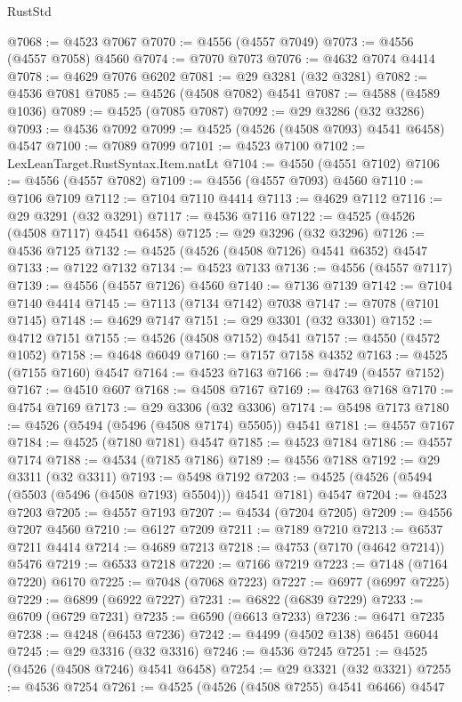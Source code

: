 \begin{lexlean}{RustStd}
\begin{coremodule}
{\begin{coremodule}
{{{{{{{{{{{{{{{{{{{{{{{{{{{{{{{{{{{{{{{{{{{{{{{{{{{{{{{@7068 := @4523 @7067
@7070 := @4556 (@4557 @7049)
@7073 := @4556 (@4557 @7058) @4560
@7074 := @7070 @7073
@7076 := @4632 @7074 @4414
@7078 := @4629 @7076 @6202
@7081 := @29 @3281 (@32 @3281)
@7082 := @4536 @7081
@7085 := @4526 (@4508 @7082) @4541
@7087 := @4588 (@4589 @1036)
@7089 := @4525 (@7085 @7087)
@7092 := @29 @3286 (@32 @3286)
@7093 := @4536 @7092
@7099 := @4525 (@4526 (@4508 @7093) @4541 @6458) @4547
@7100 := @7089 @7099
@7101 := @4523 @7100
@7102 := LexLeanTarget.RustSyntax.Item.natLt
@7104 := @4550 (@4551 @7102)
@7106 := @4556 (@4557 @7082)
@7109 := @4556 (@4557 @7093) @4560
@7110 := @7106 @7109
@7112 := @7104 @7110 @4414
@7113 := @4629 @7112
@7116 := @29 @3291 (@32 @3291)
@7117 := @4536 @7116
@7122 := @4525 (@4526 (@4508 @7117) @4541 @6458)
@7125 := @29 @3296 (@32 @3296)
@7126 := @4536 @7125
@7132 := @4525 (@4526 (@4508 @7126) @4541 @6352) @4547
@7133 := @7122 @7132
@7134 := @4523 @7133
@7136 := @4556 (@4557 @7117)
@7139 := @4556 (@4557 @7126) @4560
@7140 := @7136 @7139
@7142 := @7104 @7140 @4414
@7145 := @7113 (@7134 @7142) @7038
@7147 := @7078 (@7101 @7145)
@7148 := @4629 @7147
@7151 := @29 @3301 (@32 @3301)
@7152 := @4712 @7151
@7155 := @4526 (@4508 @7152) @4541
@7157 := @4550 (@4572 @1052)
@7158 := @4648 @6049
@7160 := @7157 @7158 @4352
@7163 := @4525 (@7155 @7160) @4547
@7164 := @4523 @7163
@7166 := @4749 (@4557 @7152)
@7167 := @4510 @607
@7168 := @4508 @7167
@7169 := @4763 @7168
@7170 := @4754 @7169
@7173 := @29 @3306 (@32 @3306)
@7174 := @5498 @7173
@7180 := @4526 (@5494 (@5496 (@4508 @7174) @5505)) @4541
@7181 := @4557 @7167
@7184 := @4525 (@7180 @7181) @4547
@7185 := @4523 @7184
@7186 := @4557 @7174
@7188 := @4534 (@7185 @7186)
@7189 := @4556 @7188
@7192 := @29 @3311 (@32 @3311)
@7193 := @5498 @7192
@7203 := @4525 (@4526 (@5494 (@5503 (@5496 (@4508 @7193) @5504))) @4541 @7181) @4547
@7204 := @4523 @7203
@7205 := @4557 @7193
@7207 := @4534 (@7204 @7205)
@7209 := @4556 @7207 @4560
@7210 := @6127 @7209
@7211 := @7189 @7210
@7213 := @6537 @7211 @4414
@7214 := @4689 @7213
@7218 := @4753 (@7170 (@4642 @7214)) @5476
@7219 := @6533 @7218
@7220 := @7166 @7219
@7223 := @7148 (@7164 @7220) @6170
@7225 := @7048 (@7068 @7223)
@7227 := @6977 (@6997 @7225)
@7229 := @6899 (@6922 @7227)
@7231 := @6822 (@6839 @7229)
@7233 := @6709 (@6729 @7231)
@7235 := @6590 (@6613 @7233)
@7236 := @6471 @7235
@7238 := @4248 (@6453 @7236)
@7242 := @4499 (@4502 @138) @6451 @6044
@7245 := @29 @3316 (@32 @3316)
@7246 := @4536 @7245
@7251 := @4525 (@4526 (@4508 @7246) @4541 @6458)
@7254 := @29 @3321 (@32 @3321)
@7255 := @4536 @7254
@7261 := @4525 (@4526 (@4508 @7255) @4541 @6466) @4547
}}}}}}}}}}}}}}}}}}}}}}}}}}}}}}}}}}}}}}}}}}}}}}}}}}}}}}}
\end{coremodule}}
\end{coremodule}
\end{lexlean}
